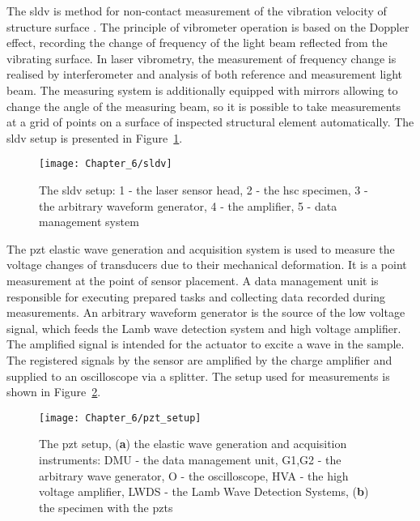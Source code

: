 \documentclass[11pt,a4paper,final]{report}
\theoremstyle{plain}
\begin{document}
The \ac{sldv} is method for non-contact measurement of the vibration velocity of structure surface \cite{staszewski2004structural}.
The principle of vibrometer operation is based on the Doppler effect, recording the change of frequency of the light beam reflected from the vibrating surface.
In laser vibrometry, the measurement of frequency change is realised by interferometer and analysis of both reference and measurement light beam.
The measuring system is additionally equipped with mirrors allowing to change the angle of the measuring beam, so it is possible to take measurements at a grid of points on a surface of inspected structural element automatically.
The \ac{sldv} setup is presented in Figure~\ref{fig:sldv}.
\begin{figure}[!htb]
	\begin{center}
		\texttt{[image: Chapter\_6/sldv]}
	\end{center}
	\caption{The \acl{sldv} setup: 1 - the laser sensor head, 2 - the \acl{hsc} specimen, 3 - the arbitrary waveform generator, 4 - the amplifier, 5 - data management system}
	\label{fig:sldv}
\end{figure}

The \ac{pzt} elastic wave generation and acquisition system is used to measure the voltage changes of transducers due to their mechanical deformation.
It is a point measurement at the point of sensor placement.
A data management unit is responsible for executing prepared tasks and collecting data recorded during measurements.
An arbitrary waveform generator is the source of the low voltage signal, which feeds the Lamb wave detection system and high voltage amplifier.
The amplified signal is intended for the actuator to excite a wave in the sample.
The registered signals by the sensor are amplified by the charge amplifier and supplied to an oscilloscope via a splitter.
The setup used for measurements is shown in Figure~\ref{fig:pzt_setup}.
\begin{figure}[!htb]
	\begin{center}
		\texttt{[image: Chapter\_6/pzt\_setup]}
	\end{center}
	\caption{The \acl{pzt} setup, (\textbf{a}) the elastic wave generation and acquisition instruments:  DMU - the data management unit, G1,G2 - the arbitrary wave generator, O - the oscilloscope, HVA - the high voltage amplifier, LWDS - the Lamb Wave Detection Systems, (\textbf{b}) the specimen with the \acfp{pzt}}
	\label{fig:pzt_setup}
\end{figure}
\end{document}
